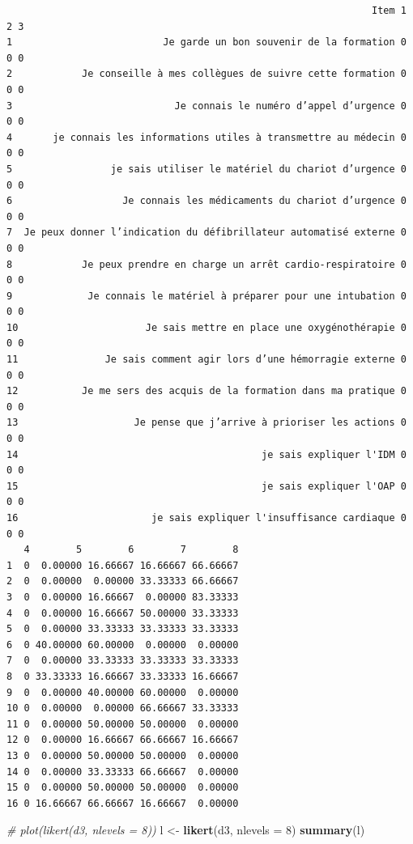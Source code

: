 \documentclass[]{article}
\newenvironment{Shaded}{\begin{snugshade}}{\end{snugshade}}
\newcommand{\KeywordTok}[1]{\textcolor[rgb]{0.13,0.29,0.53}{\textbf{{#1}}}}
\newcommand{\DataTypeTok}[1]{\textcolor[rgb]{0.13,0.29,0.53}{{#1}}}
\newcommand{\DecValTok}[1]{\textcolor[rgb]{0.00,0.00,0.81}{{#1}}}
\newcommand{\StringTok}[1]{\textcolor[rgb]{0.31,0.60,0.02}{{#1}}}
\newcommand{\CommentTok}[1]{\textcolor[rgb]{0.56,0.35,0.01}{\textit{{#1}}}}
\newcommand{\NormalTok}[1]{{#1}}
\begin{document}
\begin{verbatim}
                                                               Item 1 2 3
1                          Je garde un bon souvenir de la formation 0 0 0
2            Je conseille à mes collègues de suivre cette formation 0 0 0
3                            Je connais le numéro d’appel d’urgence 0 0 0
4       je connais les informations utiles à transmettre au médecin 0 0 0
5                 je sais utiliser le matériel du chariot d’urgence 0 0 0
6                   Je connais les médicaments du chariot d’urgence 0 0 0
7  Je peux donner l’indication du défibrillateur automatisé externe 0 0 0
8            Je peux prendre en charge un arrêt cardio-respiratoire 0 0 0
9             Je connais le matériel à préparer pour une intubation 0 0 0
10                      Je sais mettre en place une oxygénothérapie 0 0 0
11               Je sais comment agir lors d’une hémorragie externe 0 0 0
12           Je me sers des acquis de la formation dans ma pratique 0 0 0
13                    Je pense que j’arrive à prioriser les actions 0 0 0
14                                          je sais expliquer l'IDM 0 0 0
15                                          je sais expliquer l'OAP 0 0 0
16                       je sais expliquer l'insuffisance cardiaque 0 0 0
   4        5        6        7        8
1  0  0.00000 16.66667 16.66667 66.66667
2  0  0.00000  0.00000 33.33333 66.66667
3  0  0.00000 16.66667  0.00000 83.33333
4  0  0.00000 16.66667 50.00000 33.33333
5  0  0.00000 33.33333 33.33333 33.33333
6  0 40.00000 60.00000  0.00000  0.00000
7  0  0.00000 33.33333 33.33333 33.33333
8  0 33.33333 16.66667 33.33333 16.66667
9  0  0.00000 40.00000 60.00000  0.00000
10 0  0.00000  0.00000 66.66667 33.33333
11 0  0.00000 50.00000 50.00000  0.00000
12 0  0.00000 16.66667 66.66667 16.66667
13 0  0.00000 50.00000 50.00000  0.00000
14 0  0.00000 33.33333 66.66667  0.00000
15 0  0.00000 50.00000 50.00000  0.00000
16 0 16.66667 66.66667 16.66667  0.00000
\end{verbatim}

\begin{Shaded}
\begin{Highlighting}[]
\CommentTok{# plot(likert(d3, nlevels = 8))}
\NormalTok{l <-}\StringTok{ }\KeywordTok{likert}\NormalTok{(d3, }\DataTypeTok{nlevels =} \DecValTok{8}\NormalTok{)}
\KeywordTok{summary}\NormalTok{(l)}
\end{Highlighting}
\end{Shaded}
\end{document}
